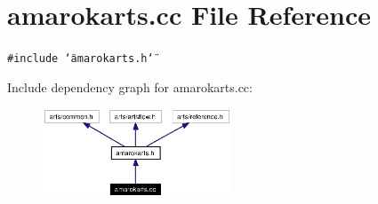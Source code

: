 \section{amarokarts.cc File Reference}
\label{amarokarts_8cc}


{\tt \#include \char`\"{}amarokarts.h\char`\"{}}\par


Include dependency graph for amarokarts.cc:\begin{figure}[H]
\begin{center}
\leavevmode
\includegraphics[width=159pt]{amarokarts_8cc__incl}
\end{center}
\end{figure}
